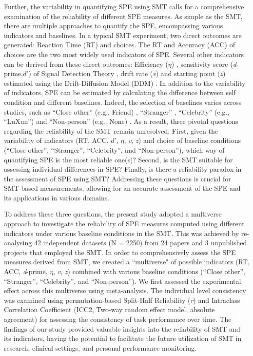 \documentclass[sn-apa]{sn-jnl}%
\theoremstyle{thmstyleone}%
\theoremstyle{thmstyletwo}%
\theoremstyle{thmstylethree}%
\begin{document}
Further, the variability in quantifying SPE using SMT calls for a comprehensive examination of the reliability of different SPE measures. As simple as the SMT, there are multiple approaches to quantify the SPE, encompassing various indicators and baselines. In a typical SMT experiment, two direct outcomes are generated: Reaction Time (RT) and choices. The RT and Accuracy (ACC) of choices are the two most widely used indicators of SPE. Several other indicators can be derived from these direct outcomes:  Efficiency ($\eta$) \parencite{humphreys2015the,stoeber2008perfectionism}, sensitivity score (\textit{d}-prime,$d'$) of Signal Detection Theory \parencite{hu2020good,sui2012perceptual}, drift rate (\textit{v}) and starting point (\textit{z}) estimated using the Drift-Diffusion Model (DDM) \parencite{macrae2017self,reuther2017does}.  In addition to the variability of indicators, SPE can be estimated by calculating the difference between self condition and different baselines. Indeed, the selection of baselines varies across studies, such as ``Close other” (e.g., Friend) \parencite{navon2021are, svensson2022more}, ``Stranger” \parencite{constable2021affective, orellana2020does}, “Celebrity” (e.g., ``LuXun”) \parencite{qian2020prioritised} and ``Non-person” (e.g., None) \parencite{schafer2019understanding}. As a result, three pivotal questions regarding the reliability of the SMT remain unresolved: First, given the variability of indicators (RT, ACC, $d'$, $\eta$, \textit{v}, \textit{z}) and choice of baseline conditions (``Close other”, ``Stranger”, ``Celebrity”, and ``Non-person”), which way of quantifying SPE is the most reliable one(s)? Second, is the SMT suitable for assessing individual differences in SPE? Finally, is there a reliability paradox in the assessment of SPE using SMT? Addressing these questions is crucial for SMT-based measurements, allowing for an accurate assessment of the SPE and its applications in various domains. 

To address these three questions, the present study adopted a multiverse approach to investigate the reliability of SPE measures computed using different indicators under various baseline conditions in the SMT. This was achieved by re-analysing 42 independent datasets (N = 2250) from 24 papers and 3 unpublished projects that employed the SMT. In order to comprehensively assess the SPE measures derived from SMT, we created a ``multiverse" of possible indicators (RT, ACC, \textit{d}-prime, $\eta$, \textit{v}, \textit{z}) combined with various baseline conditions (``Close other”, ``Stranger”, ``Celebrity”, and ``Non-person”). We first assessed the experimental effect across this multiverse using meta-analysis. The individual level consistency was examined using permutation-based Split-Half Reliability (\textit{r}) and Intraclass Correlation Coefficient (ICC2, Two-way random effect model, absolute agreement) for assessing the consistency of task performance over time. The findings of our study provided valuable insights into the reliability of SMT and its indicators, having the potential to facilitate the future utilization of SMT in research, clinical settings, and personal performance monitoring.
\end{document}
